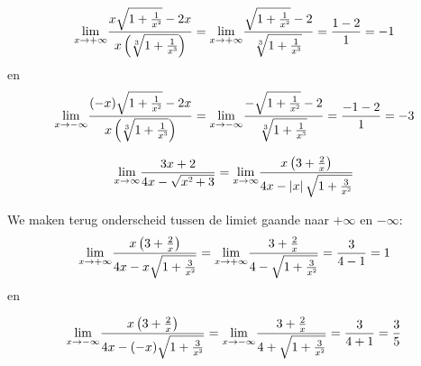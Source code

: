 \begin{itemize}
\begin{voorbeeld}
\begin{equation*}
	{\displaystyle {\displaystyle \lim_{x\to+\infty}}\frac{x\sqrt{1+\frac{1}{x\text{\texttwosuperior}}}-2x}{x\left(\sqrt[3]{1+\frac{1}{x\text{\textthreesuperior}}}\right)}={\displaystyle \lim_{x\to+\infty}}\frac{\sqrt{1+\frac{1}{x\text{\texttwosuperior}}}-2}{\sqrt[3]{1+\frac{1}{x\text{\textthreesuperior}}}}=\frac{1-2}{1}=-1}
\end{equation*}
	en
	\begin{equation*}
{\displaystyle {\displaystyle \lim_{x\to-\infty}}\frac{(-x)\sqrt{1+\frac{1}{x\text{\texttwosuperior}}}-2x}{x\left(\sqrt[3]{1+\frac{1}{x\text{\textthreesuperior}}}\right)}={\displaystyle \lim_{x\to-\infty}}\frac{-\sqrt{1+\frac{1}{x\text{\texttwosuperior}}}-2}{\sqrt[3]{1+\frac{1}{x\text{\textthreesuperior}}}}=\frac{-1-2}{1}=-3}
\end{equation*}

\end{voorbeeld}



\begin{voorbeeld}
	\begin{equation*}
{\displaystyle {\displaystyle \lim_{x\to\infty}}\frac{3x+2}{4x-\sqrt{x\text{\texttwosuperior}+3}}={\displaystyle \lim_{x\to\infty}}\frac{x\left(3+\frac{2}{x}\right)}{4x-\left|x\right|\sqrt{1+\frac{3}{x\text{\texttwosuperior}}}}}
\end{equation*}

We maken terug onderscheid tussen de limiet gaande naar $+\infty$
en $-\infty$:
\begin{equation*}
{\displaystyle \lim_{x\to+\infty}}{\displaystyle \frac{x\left(3+\frac{2}{x}\right)}{4x-x\sqrt{1+\frac{3}{x\text{\texttwosuperior}}}}={\displaystyle \lim_{x\to+\infty}}{\displaystyle \frac{3+\frac{2}{x}}{4-\sqrt{1+\frac{3}{x\text{\texttwosuperior}}}}=\frac{3}{4-1}=1}}
\end{equation*} en

\begin{equation*}
{\displaystyle \lim_{x\to-\infty}}{\displaystyle \frac{x\left(3+\frac{2}{x}\right)}{4x-(-x)\sqrt{1+\frac{3}{x\text{\texttwosuperior}}}}={\displaystyle \lim_{x\to-\infty}}{\displaystyle \frac{3+\frac{2}{x}}{4+\sqrt{1+\frac{3}{x\text{\texttwosuperior}}}}=\frac{3}{4+1}=\frac{3}{5}}}
\end{equation*}

\end{voorbeeld}
\end{itemize}

